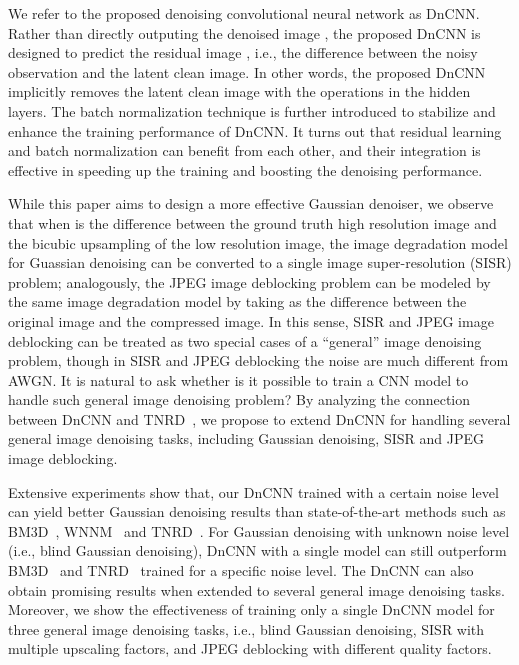 \documentclass[journal]{IEEEtran}
\begin{document}
We refer to the proposed denoising convolutional neural network as DnCNN. Rather than directly outputing the denoised image , the proposed DnCNN is designed to predict the residual image , i.e., the difference between the noisy observation and the latent clean image. In other words, the proposed DnCNN implicitly removes the latent clean image with the operations in the hidden layers. The batch normalization technique is further introduced to stabilize and enhance the training performance of DnCNN. It turns out that residual learning and batch normalization can benefit from each other, and their integration is effective in speeding up the training and boosting the denoising performance.

While this paper aims to design a more effective Gaussian denoiser, we observe that when  is the difference between the ground truth high resolution image and the bicubic upsampling of the low resolution image, the image degradation model for Guassian denoising can be converted to a single image super-resolution (SISR) problem; analogously, the JPEG image deblocking problem can be modeled by the same image degradation model by taking  as the difference between the original image and the compressed image. In this sense, SISR and JPEG image deblocking can be treated as two special cases of a ``general'' image denoising problem, though in SISR and JPEG deblocking the noise  are much different from AWGN.
It is natural to ask whether is it possible to train a CNN model to handle such general image denoising problem?
By analyzing the connection between DnCNN and TNRD~\cite{chen2015trainable}, we propose to extend DnCNN for handling several general image denoising tasks, including Gaussian denoising, SISR and JPEG image deblocking.


Extensive experiments show that, our DnCNN trained with a certain noise level can yield better Gaussian denoising results than state-of-the-art methods such as BM3D~\cite{dabov2007image}, WNNM~\cite{gu2014weighted} and TNRD~\cite{chen2015trainable}. For Gaussian denoising with unknown noise level (i.e., blind Gaussian denoising), DnCNN with a single model can still outperform BM3D~\cite{dabov2007image} and TNRD~\cite{chen2015trainable} trained for a specific noise level. The DnCNN can also obtain promising results when extended to several general image denoising tasks. Moreover, we show the effectiveness of training only a single DnCNN model for three general image denoising tasks, i.e., blind Gaussian denoising, SISR with multiple upscaling factors, and JPEG deblocking with different quality factors.
\end{document}
